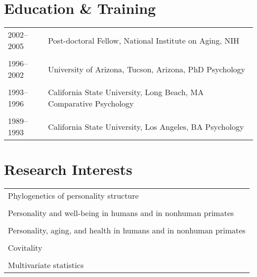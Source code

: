 \documentclass[11pt]{article}
\begin{document}
\section*{Education \& Training}

\begin{tabular}{p{3cm}p{12cm}}
2002--2005 & Post-doctoral Fellow, National Institute on Aging, NIH
\\ \\

1996--2002 & University of Arizona, Tucson, Arizona, PhD Psychology
\\ \\

1993--1996 & California State University, Long Beach, MA Comparative
Psychology \\ \\

1989--1993 & California State University, Los Angeles, BA Psychology
\end{tabular}

\section*{Research Interests}
\begin{tabular}{p{15cm}}

Phylogenetics of personality structure \\ \\

Personality and well-being in humans and in nonhuman primates \\ \\

Personality, aging, and health in humans and in nonhuman
        primates \\ \\

Covitality \\ \\
        
Multivariate statistics

\end{tabular}
\end{document}
